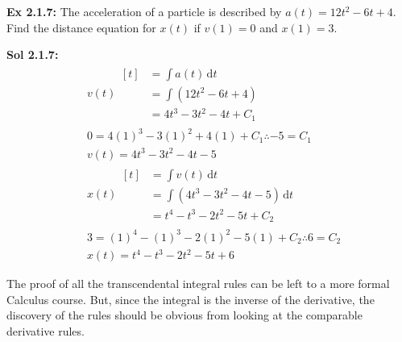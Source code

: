 \begin{tcolorbox}[example]
    \textbf{Ex 2.1.7: } The acceleration of a particle is described by $a(t) = 12t^2 - 6t + 4$. Find the distance equation for $x(t)$ if $v(1) = 0$ and $x(1) = 3$.
\end{tcolorbox}
\begin{tcolorbox}[solution]
    \textbf{Sol 2.1.7: } \begin{align*}
        & v(t) \begin{aligned}[t]
            & = \int a(t) \,\mathrm{d}t \\[11pt]
            & = \int \left(12t^2 - 6t + 4\right) \\[11pt]
            & = 4t^3 - 3t^2 - 4t + C_1 
        \end{aligned} \\[11pt]
        & 0 = 4(1)^3 - 3(1)^2 + 4(1) + C_1 \therefore -5 = C_1 \\[11pt]
        & v(t) = 4t^3 - 3t^2 - 4t - 5 \\[11pt]
        & x(t) \begin{aligned}[t]
            & = \int v(t) \,\mathrm{d}t \\[11pt]
            & = \int \left(4t^3 - 3t^2 - 4t - 5\right) \,\mathrm{d}t \\[11pt]
            & = t^4 - t^3 - 2t^2 - 5t + C_2
        \end{aligned} \\[11pt]
        & 3 = (1)^4 - (1)^3 - 2(1)^2 - 5(1) + C_2 \therefore 6 = C_2 \\[11pt]
        & \boxed{x(t) = t^4 - t^3 - 2t^2 - 5t + 6}
    \end{align*}
\end{tcolorbox}

The proof of all the transcendental integral rules can be left to a more formal Calculus course. But, since the integral is the inverse of the derivative, the discovery of the rules should be obvious from looking at the comparable derivative rules. \par

